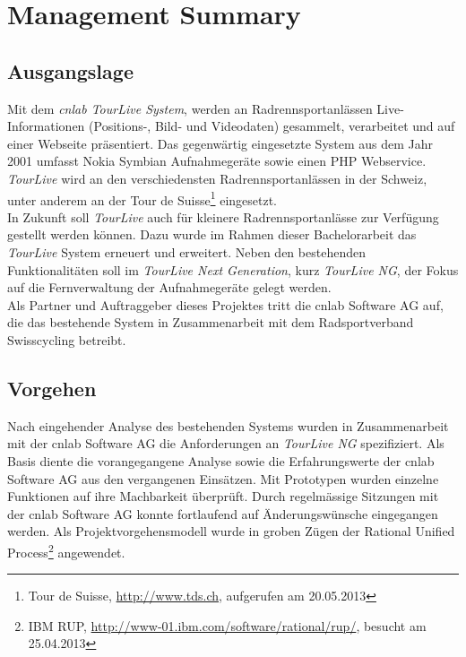 \chapter*{Management Summary}
\section*{Ausgangslage}

Mit dem \textit{cnlab TourLive System}, werden an Radrennsportanlässen Live- Informationen (Positions-, Bild- und Videodaten) gesammelt, verarbeitet und auf einer Webseite präsentiert. Das gegenwärtig eingesetzte System aus dem Jahr 2001  umfasst Nokia Symbian Aufnahmegeräte sowie einen PHP Webservice. \textit{TourLive} wird an den verschiedensten Radrennsportanlässen in der Schweiz, unter anderem an der Tour de Suisse\footnote{Tour de Suisse, \url{http://www.tds.ch}, aufgerufen am 20.05.2013} eingesetzt. 
\\

In Zukunft soll \textit{TourLive} auch für kleinere Radrennsportanlässe zur Verfügung gestellt werden können. Dazu wurde im Rahmen dieser Bachelorarbeit das \textit{TourLive} System erneuert und erweitert. Neben den bestehenden Funktionalitäten soll im \textit{TourLive Next Generation}, kurz \textit{TourLive NG}, der Fokus auf die Fernverwaltung der Aufnahmegeräte gelegt werden. 
\\

Als Partner und Auftraggeber dieses Projektes tritt die cnlab Software AG auf, die das bestehende System in Zusammenarbeit mit dem Radsportverband Swisscycling betreibt.

\section*{Vorgehen}
Nach eingehender Analyse des bestehenden Systems wurden in Zusammenarbeit mit der cnlab Software AG die Anforderungen an \textit{TourLive NG} spezifiziert. Als Basis diente die vorangegangene Analyse sowie die  Erfahrungswerte der cnlab Software AG aus den vergangenen Einsätzen. Mit Prototypen wurden einzelne Funktionen auf ihre Machbarkeit überprüft. Durch regelmässige Sitzungen mit der cnlab Software AG konnte fortlaufend auf Änderungswünsche eingegangen werden. Als Projektvorgehensmodell wurde in groben Zügen der Rational Unified Process\footnote{IBM RUP, \url{http://www-01.ibm.com/software/rational/rup/}, besucht am 25.04.2013} angewendet.
\newpage 

